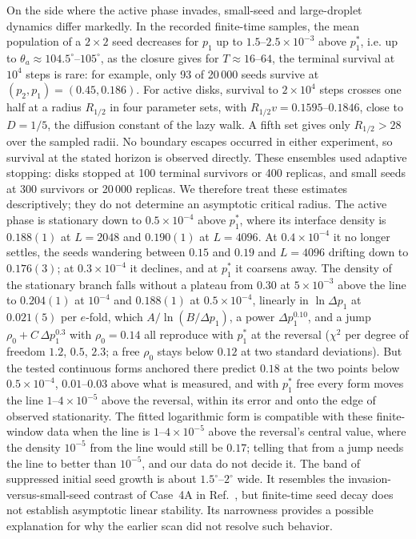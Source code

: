 \documentclass[pre,twocolumn,superscriptaddress,showpacs,floatfix]{revtex4-2}
\begin{document}
On the side where the active phase invades, small-seed and large-droplet dynamics
differ markedly. In the recorded finite-time samples, the mean population
of a $2\times2$ seed decreases for $p_1$ up to $1.5$--$2.5\times10^{-3}$ above $p_1^*$, i.e. up
to $\theta_a\approx 104.5^\circ$--$105^\circ$, as the closure gives for $T\approx 16$--$64$, the
terminal survival at $10^4$ steps is rare: for example, only 93 of
20\,000 seeds survive at $(p_2,p_1)=(0.45,0.186)$.
For active disks, survival to $2\times10^4$ steps crosses one half at a
radius $R_{1/2}$ in four parameter sets, with
$R_{1/2}v=0.1595$--$0.1846$, close to $D=1/5$, the diffusion constant of
the lazy walk. A fifth set gives only $R_{1/2}>28$ over the sampled radii.
No boundary escapes occurred in either experiment, so survival at the stated
horizon is observed directly. These ensembles used adaptive stopping:
disks stopped at 100 terminal survivors or 400 replicas, and small seeds at
300 survivors or 20\,000 replicas. We therefore treat these estimates
descriptively; they do not determine an asymptotic critical radius.
The active phase is
stationary down to $0.5\times10^{-4}$ above $p_1^*$, where its interface density is $0.188(1)$
at $L = 2048$ and $0.190(1)$ at $L = 4096$. At $0.4\times10^{-4}$ it no longer settles, the
seeds wandering between $0.15$ and $0.19$ and $L = 4096$ drifting down to $0.176(3)$; at
$0.3\times10^{-4}$ it declines, and at $p_1^*$ it coarsens away. The density of the stationary
branch falls without a plateau from $0.30$ at $5\times10^{-3}$ above the line to $0.204(1)$ at
$10^{-4}$ and $0.188(1)$ at $0.5\times10^{-4}$, linearly in $\ln\Delta p_1$ at $0.021(5)$ per
$e$-fold, which $A/\ln(B/\Delta p_1)$, a power $\Delta p_1^{0.10}$, and a jump
$\rho_0 + C\,\Delta p_1^{0.3}$ with $\rho_0 = 0.14$ all reproduce with $p_1^*$ at the reversal
($\chi^2$ per degree of freedom $1.2$, $0.5$, $2.3$; a free $\rho_0$ stays below $0.12$ at two
standard deviations). But the tested continuous forms anchored there predict $0.18$ at the two points
below $0.5\times10^{-4}$, $0.01$--$0.03$ above what is measured, and with $p_1^*$ free every form
moves the line $1$--$4\times10^{-5}$ above the reversal, within its error and onto the edge of observed
stationarity. The fitted logarithmic form is compatible with these finite-window
data when the line is $1$--$4\times10^{-5}$ above the reversal's central value,
where the density $10^{-5}$ from
the line would still be $0.17$; telling that from a jump needs the line to better than
$10^{-5}$, and our data do not decide it. The band of suppressed initial seed growth is about $1.5^\circ$--$2^\circ$ wide. It resembles the invasion-versus-small-seed contrast of Case~4A in Ref.~\cite{cox2013}, but finite-time seed decay does not establish asymptotic linear stability. Its narrowness provides a possible explanation for why the earlier scan did not resolve such behavior.
\end{document}
